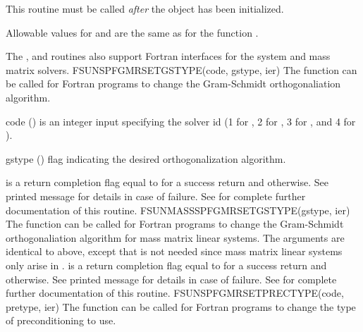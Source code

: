 {
  This routine must be called \emph{after} the {\nvector} object has
  been initialized.

  Allowable values for  and  are the same as for
  the {\CC} function \newline {}.
}
%
The , 
and \newline {} routines also
support Fortran interfaces for the system and mass matrix solvers.
%
%
{
  FSUNSPFGMRSETGSTYPE(code, gstype, ier)
}
{
  The function  can be called for Fortran
  programs to change the Gram-Schmidt orthogonaliation algorithm.
}
{
  \begin{args}[gstype]
  \item[code] ()
    is an integer input specifying the solver id (1 for {\cvode}, 2
    for {\ida}, 3 for {\kinsol}, and 4 for {\arkode}).
  \item[gstype] ()
    flag indicating the desired orthogonalization algorithm.
  \end{args}
}
{
   is a  return completion flag equal to  for a success
  return and  otherwise. See printed message for details in case
  of failure.
}
{
  See  for complete further documentation of
  this routine.
}
%
%
{
  FSUNMASSSPFGMRSETGSTYPE(gstype, ier)
}
{
  The function  can be called for Fortran
  programs to change the Gram-Schmidt orthogonaliation algorithm for
  mass matrix linear systems.
}
{
  The arguments are identical to  above, except that
   is not needed since mass matrix linear systems only arise
  in {\arkode}.
}
{
   is a  return completion flag equal to  for a success
  return and  otherwise. See printed message for details in case
  of failure.
}
{
  See  for complete further documentation of
  this routine.
}
%
%
{
  FSUNSPFGMRSETPRECTYPE(code, pretype, ier)
}
{
  The function  can be called for Fortran
  programs to change the type of preconditioning to use.
}
